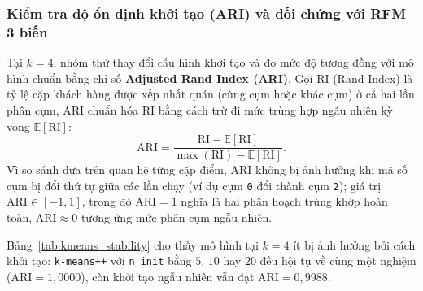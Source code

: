 \documentclass[12pt,a4paper]{article}
\numberwithin{equation}{section}
\numberwithin{table}{section}
\numberwithin{figure}{section}
\begin{document}
\subsubsection{Kiểm tra độ ổn định khởi tạo (ARI) và đối chứng với RFM 3 biến}

Tại $k = 4$, nhóm thử thay đổi cấu hình khởi tạo và đo mức độ tương đồng với mô hình chuẩn bằng chỉ số \textbf{Adjusted Rand Index (ARI)}. Gọi $\mathrm{RI}$ (Rand Index) là tỷ lệ cặp khách hàng được xếp nhất quán (cùng cụm hoặc khác cụm) ở cả hai lần phân cụm, ARI chuẩn hóa $\mathrm{RI}$ bằng cách trừ đi mức trùng hợp ngẫu nhiên kỳ vọng $\mathbb{E}[\mathrm{RI}]$:
\begin{equation}
    \mathrm{ARI} = \frac{\mathrm{RI} - \mathbb{E}[\mathrm{RI}]}{\max(\mathrm{RI}) - \mathbb{E}[\mathrm{RI}]}.
    \label{eq:ari}
\end{equation}
Vì so sánh dựa trên quan hệ từng cặp điểm, ARI không bị ảnh hưởng khi mã số cụm bị đổi thứ tự giữa các lần chạy (ví dụ cụm \texttt{0} đổi thành cụm \texttt{2}); giá trị $\mathrm{ARI} \in [-1, 1]$, trong đó $\mathrm{ARI} = 1$ nghĩa là hai phân hoạch trùng khớp hoàn toàn, $\mathrm{ARI} \approx 0$ tương ứng mức phân cụm ngẫu nhiên.

\begin{table}[H]
\centering
\footnotesize
{}
\caption{Kiểm tra độ ổn định của K-Means ($k = 4$) theo các cấu hình khởi tạo.}
\label{tab:kmeans_stability}
\end{table}

Bảng~\ref{tab:kmeans_stability} cho thấy mô hình tại $k = 4$ ít bị ảnh hưởng bởi cách khởi tạo: \texttt{k-means++} với \texttt{n\_init} bằng $5$, $10$ hay $20$ đều hội tụ về cùng một nghiệm ($\mathrm{ARI} = 1,0000$), còn khởi tạo ngẫu nhiên vẫn đạt $\mathrm{ARI} = 0,9988$.
\end{document}
